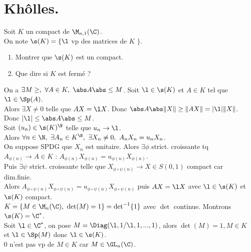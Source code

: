 \documentclass[11pt]{article}
\begin{document}
\section{Khôlles.}

\begin{exercice}{}{}
    Soit $K$ un compact de $\M_{n,1}(\C)$.\\
    On note $\s(K)=\{\l $ vp des matrices de $K$ $\}$.
    \begin{enumerate}
        \item Montrer que $\s(K)$ est un compact.
        \item Que dire si $K$ est fermé ?
    \end{enumerate}
    \tcblower
     On a $\exists M \geq , ~ \forall A \in K, ~ \abs A \abs \leq M$.
    Soit $\l\in\s(K)$ et $A\in K$ tel que $\l\in\Sp(A)$.\\
    Alors $\exists X \neq 0$ telle que $AX=\l X$. Donc $\abs A\abs \|X\| \geq \| AX \| = |\l|\|X\|$.\\
    Donc $|\l| \leq \abs A \abs \leq M$.\\
     Soit $(u_n)\in\s(K)^\N$ telle que $u_n\to \l$.\\
    Alors $\forall n \in \N, ~ \exists A_n \in K^\N, ~ \exists X_n\neq 0, ~ A_nX_n = u_nX_n$.\\
    On suppose SPDG que $X_n$ est unitaire. Alors $\exists \phi$ strict. croissante tq $A_{\phi(n)}\to A\in K$ : $A_{\phi(n)}X_{\phi(n)}=u_{\phi(n)}X_{\phi(n)}$.\\
    Puis $\exists \psi$ strict. croissante telle que $X_{\phi\circ\psi(n)}\to X\in S(0,1)$ compact car dim.finie.\\
    Alors $A_{\phi\circ\psi(n)}X_{\phi\circ\psi(n)}=u_{\phi\circ\psi(n)}X_{\phi\circ\psi(n)}$ puis $AX=\l X$ avec $\l\in\s(K)$ et $\s(K)$ compact.\\
     $K=\{M \in \M_n(\C), ~ \det(M)=1\}=\det^{-1}\{1\}$ avec $\det$ continue. Montrons $\s(K)=\C^*$.\\
    \boxed{\supset} Soit $\l\in\C^*$, on pose $M=\Diag(\l,1/\l,1,...,1)$, alors $\det(M)=1, M\in K$ et $\l\in\Sp(M)$ donc $\l\in\s(K)$.\\
    \boxed{\subset} $0$ n'est pas vp de $M\in K$ car $M\in\GL_n(\C)$.
\end{exercice}
\end{document}
